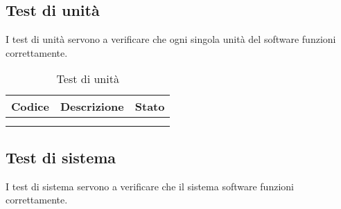 \documentclass[10pt]{article}
\begin{document}
\begin{justify}
\subsection{Test di unità}
I test di unità servono a verificare che ogni singola unità del software funzioni correttamente.\\

\begin{longtable}{|>{\centering\arraybackslash}m{2cm}|>{\centering\arraybackslash}m{7cm}|>{\centering\arraybackslash}m{2cm}|}
\hline
\textbf{Codice} & \textbf{Descrizione} & \textbf{Stato}\\
\endhead
\hline
 & & \\
\hline
\caption{Test di unità}\\
\end{longtable}

\subsection{Test di sistema} %
I test di sistema servono a verificare che il sistema software funzioni correttamente.\\


\end{justify}
\end{document}
